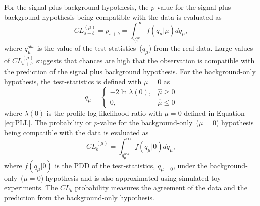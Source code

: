 \newline
For the signal plus background hypothesis, the $p$-value for the signal plus background hypothesis being compatible with the data is evaluated as 
\begin{equation}
 CL^{(\mu)}_{s+b} = p_{s+b} = \int^{\infty}_{q^{obs}_{\mu}} f(q_{\mu}|\mu) dq_{\mu},
\end{equation}
where $q^{obs}_{\mu}$ is the value of the test-statistics~($q_{\mu}$) from the real data. Large values of $ CL^{(\mu)}_{s+b}$ suggests that chances are high that the observation is compatible with the prediction of the signal plus background hypothesis.
\newline
For the background-only hypothesis, the test-statistics  is defined with $\mu = 0$ as
\[\label{eq:HNULL}
 q_{\mu} = \left\lbrace  
  \begin{array}{ll}
 -2\ln \lambda(0), & \hat{\mu} \geq 0 \\
   0,              & \hat{\mu} \leq 0
  \end{array}
  \right.
\]
where $\lambda(0)$ is the profile log-likelihood ratio with $\mu = 0$ defined in Equation \ref{eq:PLL}.
The probability or $p$-value for the background-only~($\mu = 0$) hypothesis being compatible with the data is evaluated as
\begin{equation}\label{eq:HALT}
 CL^{(\mu)}_{b} = \int^{\infty}_{q^{obs}_{\mu}} f(q_{\mu}|0) dq_{\mu},
\end{equation}
where $f(q_{\mu}|0)$ is the PDD of the test-statistics, $q_{\mu = 0}$, under the background-only~($\mu = 0$) hypothesis and is also approximated using simulated toy experiments. The $CL_{b}$ probability measures the agreement of the data and the prediction from the background-only hypothesis.
